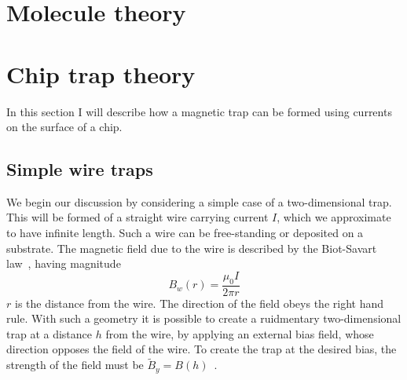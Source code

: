 
\section{Molecule theory}
\label{theory:molecules}


\section{Chip trap theory}
\label{theory:chips}

In this section I will describe how a magnetic trap can be formed using
currents on the surface of a chip.

\subsection{Simple wire traps}

We begin our discussion by considering a simple case of a two-dimensional trap.
This will be formed of a straight wire carrying current $I$, which we approximate to have infinite
length. Such a wire can be free-standing or deposited on a substrate.
The magnetic field due to the wire is
described by the Biot-Savart law~\cite{}, having magnitude
%
\begin{equation}
  B_w(r) = \frac{\mu_0 I}{2 \pi r}
\end{equation}
%
$r$ is the distance from the wire. The direction of the field obeys the right
hand rule. With such a geometry it is possible to create a ruidmentary
two-dimensional trap at a distance $h$ from the wire, by applying an external
bias field, whose direction opposes the field of the wire. To create the trap
at the desired bias, the strength of the field must be $\tilde{B}_y =
B(h)$~\cite{2011Ac}.

